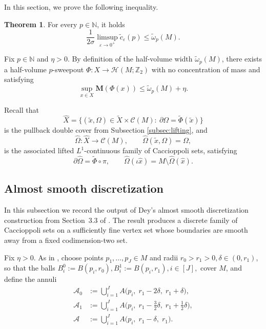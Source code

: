 \documentclass[12pt,english]{article}
\theoremstyle{definition}
\newtheorem{theorem}{Theorem}[section]
\begin{document}
In this section, we prove the following inequality.

\begin{theorem} \label{thm:lpwp}
For every $p \in \mathbb{N}$, it holds
	\[\frac{1}{2\sigma}\limsup_{\varepsilon \to 0^+} \tilde c_\varepsilon(p) \leq \tilde\omega_p(M).\]
\end{theorem}

Fix $p\in\mathbb{N}$ and $\eta>0$. By definition of the half-volume width $\tilde\omega_p(M)$, there exists a half-volume $p$-sweepout $\Phi:X \to \mathcal H(M;\mathbb{Z}_2)$ with no concentration of mass and satisfying
\[
\sup_{x\in X}\mathbf M(\Phi(x)) \le \tilde\omega_p(M)+\eta.
\]

Recall that
\[
\widehat X
=\{(\tilde x,\Omega)\in \tilde X\times \mathcal C(M):\ \partial\Omega=\tilde \Phi(\tilde x)\}
\]
is the pullback double cover from Subsection \ref{subsec:lifting}, and
\[
\widehat\Omega:\widehat X\to\mathcal C(M),
\qquad
\widehat\Omega(\tilde x,\Omega)=\Omega,
\]
is the associated lifted $L^1$-continuous family of Caccioppoli sets, satisfying
\[
\partial\widehat\Omega=\tilde \Phi\circ\pi,
\qquad
\widehat\Omega(\iota\hat x)=M\setminus \widehat\Omega(\hat x).
\]

\subsection{Almost smooth discretization}\label{subsec:almost-smooth}

In this subsection we record the output of Dey's almost smooth discretization
construction from Section~3.3 of \cite{Dey}. The result produces a discrete family of Caccioppoli sets on a sufficiently fine vertex set whose boundaries are smooth away from a fixed codimension-two set.

Fix $\eta>0$. As in \cite[Section 3.1]{Dey}, choose points $p_1,\dots,p_J\in M$ and radii $r_0>r_1>0, \delta\in(0,r_1)$,
so that the balls $B_i^0:=B(p_i,r_0), B_i^1:=B(p_i,r_1), i\in[J],$
cover $M$, and define the annuli
\[
\begin{aligned}
\mathcal A_0
&:=\bigcup_{i=1}^J A\bigl(p_i,\; r_1-2\delta,\; r_1+\delta\bigr),\\
\mathcal A_1
&:=\bigcup_{i=1}^J A\bigl(p_i,\; r_1-\tfrac32\delta,\; r_1+\tfrac12\delta\bigr),\\
\mathcal A
&:=\bigcup_{i=1}^J A\bigl(p_i,\; r_1-\delta,\; r_1\bigr).
\end{aligned}
\]
\end{document}
